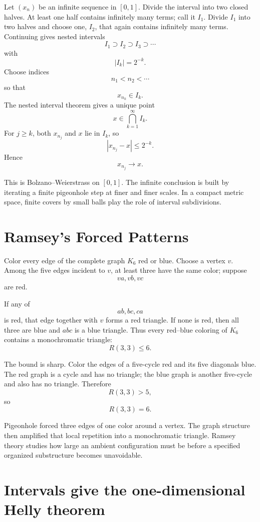 Let \((x_n)\) be an infinite sequence in \([0,1]\).  Divide the interval into two closed halves.  At least one half contains infinitely many terms; call it \(I_1\).  Divide \(I_1\) into two halves and choose one, \(I_2\), that again contains infinitely many terms.  Continuing gives nested intervals
\[
  I_1\supset I_2\supset I_3\supset\cdots
\]
with
\[
  |I_k|=2^{-k}.
\]
Choose indices
\[
  n_1<n_2<\cdots
\]
so that
\[
  x_{n_k}\in I_k.
\]
The nested interval theorem gives a unique point
\[
  x\in\bigcap_{k=1}^\infty I_k.
\]
For \(j\ge k\), both \(x_{n_j}\) and \(x\) lie in \(I_k\), so
\[
  |x_{n_j}-x|\le2^{-k}.
\]
Hence
\[
  x_{n_j}\to x.
\]

This is Bolzano--Weierstrass on \([0,1]\).  The infinite conclusion is built by iterating a finite pigeonhole step at finer and finer scales.  In a compact metric space, finite covers by small balls play the role of interval subdivisions.

\section{Ramsey's Forced Patterns}

Color every edge of the complete graph \(K_6\) red or blue.  Choose a vertex \(v\).  Among the five edges incident to \(v\), at least three have the same color; suppose
\[
  va,vb,vc
\]
are red.

If any of
\[
  ab,bc,ca
\]
is red, that edge together with \(v\) forms a red triangle.  If none is red, then all three are blue and \(abc\) is a blue triangle.  Thus every red--blue coloring of \(K_6\) contains a monochromatic triangle:
\[
  R(3,3)\le6.
\]

The bound is sharp.  Color the edges of a five-cycle red and its five diagonals blue.  The red graph is a cycle and has no triangle; the blue graph is another five-cycle and also has no triangle.  Therefore
\[
  R(3,3)>5,
\]
so
\[
  \boxed{R(3,3)=6.}
\]

Pigeonhole forced three edges of one color around a vertex.  The graph structure then amplified that local repetition into a monochromatic triangle.  Ramsey theory studies how large an ambient configuration must be before a specified organized substructure becomes unavoidable.

\section{Intervals give the one-dimensional Helly theorem}

